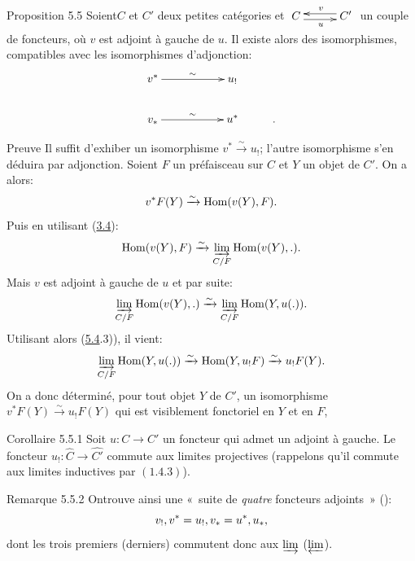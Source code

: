 \documentclass[10pt]{../fichiers-configuration-latex/smfart}
\begin{document}
\begin{enonce*}{Proposition 5.5}
Soient\pageoriginale $C$ et $C'$ deux petites catégories et
$\xymatrix@C=1cm{
 C \ar@<-2.5pt>[r]_{u} & C'\ar@<-2.5pt>[l]_{v}
}$ un couple de foncteurs, où $v$ est adjoint à gauche de $u$. Il
existe alors des isomorphismes, compatibles avec les isomorphismes
d'adjonction:
\[
\xymatrix@R=.75cm{
v^{\ast} \ar[rr]^{\sim}&    & u_!      &\\
v_{\ast} \ar[rr]^{\sim}&    & u^{\ast} & . }
\]
\end{enonce*}

\begin{enonce*}[remark]{Preuve}
Il suffit d'exhiber un isomorphisme $v^\ast\xrightarrow{\sim}
u_{!}$; l'autre isomorphisme s'en déduira par adjonction. Soient $F$
un préfaisceau sur $C$ et $Y$ un objet de $C'$. On a alors:
$$
v^\ast F(Y)\xrightarrow{\sim} \operatorname{Hom}(v(Y),F){}.
$$
Puis en utilisant (\hyperref[I.prop3.4]{3.4}):
$$
\operatorname{Hom}(v(Y),F)\xrightarrow{\sim} \varinjlim_{C/F} \operatorname{Hom}(v(Y),.){}.
$$
Mais $v$ est adjoint à gauche de $u$ et par suite:
$$
\varinjlim_{C/F}\operatorname{Hom}(v(Y),.)\xrightarrow{\sim}\varinjlim_{C/F}\operatorname{Hom}(Y,u(.)){}.
$$
Utilisant alors (\hyperref[I.prop5.4]{5.4}.3)), il vient:
$$
\varinjlim_{C/F}\operatorname{Hom}(Y,u(.))\xrightarrow{\sim}
\operatorname{Hom}(Y,u_{!}F)\xrightarrow{\sim} u_{!}F(Y){}.
$$
On a donc déterminé, pour tout objet $Y$ de $C'$, un isomorphisme
$v^\ast F(Y)\xrightarrow{\sim} u_{!}F(Y)$ qui est visiblement
fonctoriel en $Y$ et en $F$, \cqfd
\end{enonce*}

\begin{enonce*}{Corollaire 5.5.1}
Soit $u:C\rightarrow C'$ un foncteur qui admet un adjoint à gauche.
Le foncteur $u_{!}:\widehat{C}\rightarrow
\widehat{C'}$ commute aux limites projectives
(rappelons qu'il commute aux limites inductives par $(1.4.3)$).
\end{enonce*}

\begin{enonce*}[remark]{Remarque 5.5.2}
On\pageoriginale trouve ainsi une « suite de \emph{quatre}
foncteurs adjoints » ():
$$
v_{!}, v^\ast=u_{!}, v_\ast = u^\ast, u_\ast{},
$$
dont les trois premiers (\resp  derniers) commutent donc aux
$\varinjlim$ (\resp  $\varprojlim$).
\end{enonce*}
\end{document}
